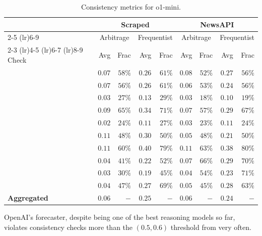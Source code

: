 \begin{table}[htbp]
\centering
  \caption{Consistency metrics for o1-mini.}
  \label{cfc:tab:o1-mini}
  \small
  \begin{tabular}{@{} lrrrrrrrr @{}}
    \toprule
    & \multicolumn{4}{c}{Scraped} & \multicolumn{4}{c}{NewsAPI} \\
    \cmidrule(lr){2-5} \cmidrule(lr){6-9}
    & \multicolumn{2}{c}{Arbitrage} & \multicolumn{2}{c}{Frequentist} & \multicolumn{2}{c}{Arbitrage} & \multicolumn{2}{c}{Frequentist} \\
    \cmidrule(lr){2-3} \cmidrule(lr){4-5} \cmidrule(lr){6-7} \cmidrule(lr){8-9}
    Check & Avg & Frac & Avg & Frac & Avg & Frac & Avg & Frac \\
    \midrule
    \NegChecker{} & $0.07$ & $58\%$ & $0.26$ & $61\%$ & $0.08$ & $52\%$ & $0.27$ & $56\%$ \\
    \ParaphraseChecker{} & $0.07$ & $56\%$ & $0.26$ & $61\%$ & $0.06$ & $53\%$ & $0.24$ & $56\%$ \\
    \ConsequenceChecker{} & $0.03$ & $27\%$ & $0.13$ & $29\%$ & $0.03$ & $18\%$ & $0.10$ & $19\%$ \\
    \AndOrChecker{} & $0.09$ & $65\%$ & $0.34$ & $71\%$ & $0.07$ & $57\%$ & $0.29$ & $67\%$ \\
    \AndChecker{} & $0.02$ & $24\%$ & $0.11$ & $27\%$ & $0.03$ & $23\%$ & $0.11$ & $24\%$ \\
    \OrChecker{} & $0.11$ & $48\%$ & $0.30$ & $50\%$ & $0.05$ & $48\%$ & $0.21$ & $50\%$ \\
    \ButChecker{} & $0.11$ & $60\%$ & $0.40$ & $79\%$ & $0.11$ & $63\%$ & $0.38$ & $80\%$ \\
    \CondChecker{} & $0.04$ & $41\%$ & $0.22$ & $52\%$ & $0.07$ & $66\%$ & $0.29$ & $70\%$ \\
    \CondCondChecker{} & $0.03$ & $30\%$ & $0.19$ & $45\%$ & $0.04$ & $54\%$ & $0.23$ & $71\%$ \\
    \ExpectedEvidenceChecker{} & $0.04$ & $47\%$ & $0.27$ & $69\%$ & $0.05$ & $45\%$ & $0.28$ & $63\%$ \\
    \midrule
    \textbf{Aggregated} & $0.06$ & $-$ & $0.25$ & $-$ & $0.06$ & $-$ & $0.24$ & $-$ \\
    \bottomrule
  \end{tabular}
\end{table}
OpenAI's \oonemini{} forecaster, despite being one of the best reasoning models so far, violates consistency checks more than the $(0.5, 0.6)$ threshold from  very often.

